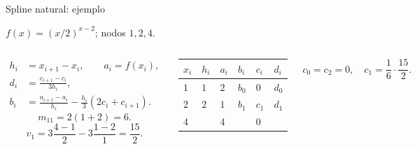\documentclass[original_version/main.tex]{subfiles}
\begin{document}
\begin{frame}[t]{Spline natural: ejemplo}
\par\noindent\begin{minipage}[t][9mm][t]{\textwidth}\small\strut $f(x)=(x/2)^{x-2}$; nodos $1,2,4$.\end{minipage}\par\nointerlineskip
\begin{columns}[T]\scriptsize\begin{align*}
h_i&=x_{i+1}-x_i,\qquad a_i=f(x_i),\\
d_i&=\frac{c_{i+1}-c_i}{3h_i},\\
b_i&=\frac{a_{i+1}-a_i}{h_i}-\frac{h_i}{3}(2c_i+c_{i+1}).
\end{align*}\scriptsize\[m_{11}=2(1+2)=6.\]\[v_1=3\frac{4-1}{2}-3\frac{1-2}{1}=\frac{15}{2}.\]\begin{minipage}[t]{\textwidth}\begingroup\scriptsize\setlength{\tabcolsep}{2pt}\begin{center}\begin{tabular}{|C{.12\textwidth}|C{.12\textwidth}|C{.12\textwidth}|C{.12\textwidth}|C{.12\textwidth}|C{.12\textwidth}|}\hline
\rule[-2mm]{0pt}{6mm}$x_i$&$h_i$&$a_i$&$b_i$&$c_i$&$d_i$\\\hline
\rule[-2.5mm]{0pt}{7mm}$1$&$1$&$2$&$b_0$&$0$&$d_0$\\\hline
\rule[-2.5mm]{0pt}{7mm}$2$&$2$&$1$&$b_1$&$c_1$&$d_1$\\\hline
\rule[-2.5mm]{0pt}{7mm}$4$&&$4$&&$0$&\\\hline
\end{tabular}\end{center}\endgroup\end{minipage}\par
\scriptsize\[c_0=c_2=0,\quad c_1=\frac16\cdot\frac{15}{2}.\]\end{columns}
\end{frame}
\end{document}
